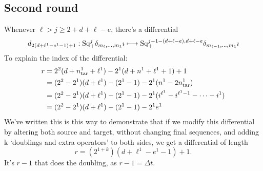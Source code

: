 \documentclass[10pt]{article}
\newcommand{\SqShift}{\Sq_{\smash{+}}}
\newcommand{\Sq}{\mathrm{Sq}}
\begin{document}
\begin{conjectured differentials}
\subsection{Second round}
Whenever $\ell>j\geq2+d+\ell-e$, there's a differential
\[d_{2(d+\ell^1-e^1-1)+1}:\SqShift^j\delta_{m_\ell,\ldots,m_1}\imath\mapsto\SqShift^{j-1-(d+\ell-e),d+\ell-e}\delta_{m_{\ell-1},\ldots,m_1}\imath\]
To explain the index of the differential:
\begin{alignat*}{2}
r
&=
2^2(d+n_\textup{tar}^1+\ell^1)-2^1(d+n^1+\ell^1+1)+1%
\\
&=
(2^2-2^1)(d+\ell^1)-(2^1-1)-2^1(n^1-2n^1_\textup{tar})%
\\
&=
(2^2-2^1)(d+\ell^1)-(2^1-1)-2^1(i^{\ell^1}-i^{\ell^1-1}-\cdots -i^{1})%
\\
&=
(2^2-2^1)(d+\ell^1)-(2^1-1)-2^1e^1%
\end{alignat*}
We've written this is this way to demonstrate that if we modify this differential by altering both source and target, without changing final sequences, and adding k `doublings and extra operators' to both sides, we get a differential of length
\[r=(2^{1+k})(d+\ell^1-e^1-1)+1.\]
It's $r-1$ that does the doubling, as $r-1=\Delta t$.




\end{conjectured differentials}
\end{document}
